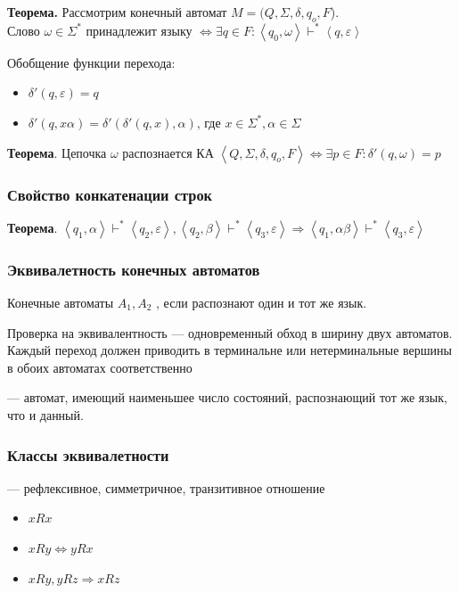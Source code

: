 \documentclass[a4paper, 14pt]{extarticle}
\begin{document}
\begin{tcolorbox}
    \textbf{Теорема.} Рассмотрим конечный автомат $M = (Q, \Sigma, \delta, q_o, F$).\\
    Слово $\omega \in \Sigma^*$ принадлежит языку $ \Leftrightarrow \exists q \in F: \left\langle q_0, \omega \right\rangle \vdash^* \left\langle q, \varepsilon \right\rangle $
\end{tcolorbox}

Обобщение функции перехода:
\begin{itemize}
    \item $\delta'(q, \varepsilon) = q$
    \item $\delta'(q, x \alpha) = \delta'(\delta'(q, x), \alpha)$, где $x \in \Sigma^*, \alpha \in \Sigma $
\end{itemize}

\begin{tcolorbox}
    \textbf{Теорема}. Цепочка $ \omega $ распознается КА $ \left\langle Q, \Sigma, \delta, q_o, F \right\rangle \Leftrightarrow \exists p \in F: \delta'(q, \omega) = p $
\end{tcolorbox}

\subsubsection*{Свойство конкатенации строк}
\begin{tcolorbox}
    \textbf{Теорема}. $ \left\langle q_1, \alpha \right\rangle \vdash^* \left\langle q_2, \varepsilon \right\rangle, \left\langle q_2, \beta \right\rangle \vdash^* \left\langle q_3, \varepsilon \right\rangle \Rightarrow \left\langle q_1, \alpha\beta \right\rangle \vdash^* \left\langle q_3, \varepsilon \right\rangle  $
\end{tcolorbox}

\subsubsection{Эквивалетность конечных автоматов}
Конечные автоматы $A_1, A_2$ , если распознают один и тот же язык.

Проверка на эквивалентность --- одновременный обход в ширину двух автоматов. Каждый переход должен приводить в терминальне или нетерминальные вершины в обоих автоматах соответственно

 --- автомат, имеющий наименьшее число состояний, распознающий тот же язык, что и данный. 

\subsubsection{Классы эквивалетности}
 --- рефлексивное, симметричное, транзитивное отношение
\begin{itemize}
    \item $xRx$
    \item $xRy \Longleftrightarrow yRx$
    \item $xRy, yRz \Rightarrow xRz$
\end{itemize}
\end{document}
